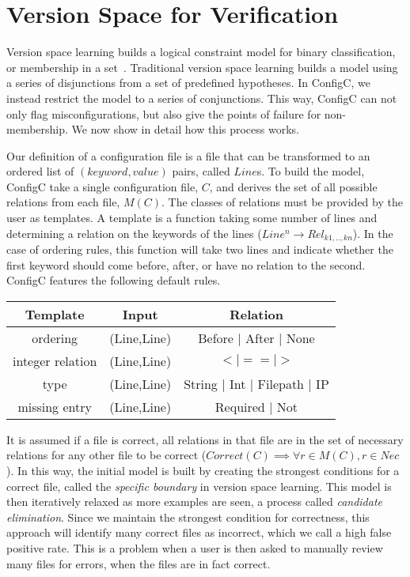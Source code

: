\section{Version Space for Verification}

Version space learning builds a logical constraint model for binary classification, or membership in a set~\cite{mitchell82}.
Traditional version space learning builds a model using a series of disjunctions from a set of predefined hypotheses.
In ConfigC, we instead restrict the model to a series of conjunctions.
This way, ConfigC can not only flag misconfigurations, but also give the points of failure for non-membership.
We now show in detail how this process works.

Our definition of a configuration file is a file that can be transformed to an ordered list of $(keyword, value)$ pairs, called $Line$s.
To build the model, ConfigC take a single configuration file, $C$, and derives the set of all possible relations from each file, $M(C)$.
The classes of relations must be provided by the user as templates.
A template is a function taking some number of lines and determining a relation on the keywords of the lines ($Line^{n} \rightarrow Rel_{k1,..,kn}$).
In the case of ordering rules, this function will take two lines and indicate whether the first keyword should come before, after, or have no relation to the second. 
ConfigC features the following default rules.

\begin{center}
\begin{tabular} {|c |c |c |}
 \hline
 Template & Input  & Relation \\
\hline
 ordering & (Line,Line) & Before $\vert$ After $\vert$ None \\
 \hline
 integer relation & (Line,Line)  & $< | == | >$  \\
\hline
 type & (Line,Line)  & String $\vert$ Int $\vert$ Filepath $\vert$ IP  \\
\hline
 missing entry & (Line,Line) & Required $\vert$ Not \\
\hline
\end{tabular}
\end{center}

It is assumed if a file is correct, all relations in that file are in the set of necessary relations for any other file to be correct ($Correct(C) \implies \forall r \in M(C), r \in Nec$).
In this way, the initial model is built by creating the strongest conditions for a correct file, called the \textit{specific boundary} in version space learning.
This model is then iteratively relaxed as more examples are seen, a process called \textit{candidate elimination}.
Since we maintain the strongest condition for correctness, this approach will identify many correct files as incorrect, which we call a high false positive rate.
This is a problem when a user is then asked to manually review many files for errors, when the files are in fact correct.

